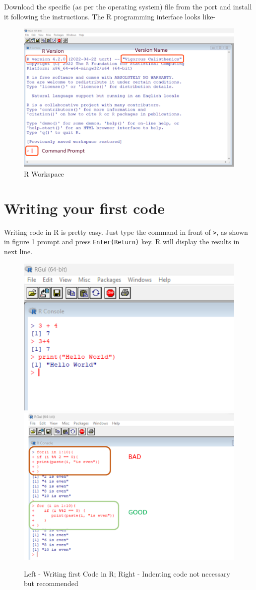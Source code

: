 \documentclass[
]{book}
\begin{document}
Download the specific (as per the operating system) file from the port and install it following the instructions. The R programming interface looks like-

\begin{figure}

{\centering \includegraphics[width=0.7\linewidth]{images/workspace} 

}

\caption{R Workspace}\label{fig:workspace}
\end{figure}

\hypertarget{writing-your-first-code}{%
\section{Writing your first code}\label{writing-your-first-code}}

Writing code in R is pretty easy. Just type the command in front of \texttt{\textgreater{}}, as shown in figure \ref{fig:workspace} prompt and press \texttt{Enter(Return)} key. R will display the results in next line.

\begin{figure}

{\centering \includegraphics[width=0.49\linewidth,height=0.49\textheight]{images/first_code} \includegraphics[width=0.49\linewidth,height=0.49\textheight]{images/indent} 

}

\caption{Left - Writing first Code in R; Right - Indenting code not necessary but recommended}\label{fig:first}
\end{figure}
\end{document}
